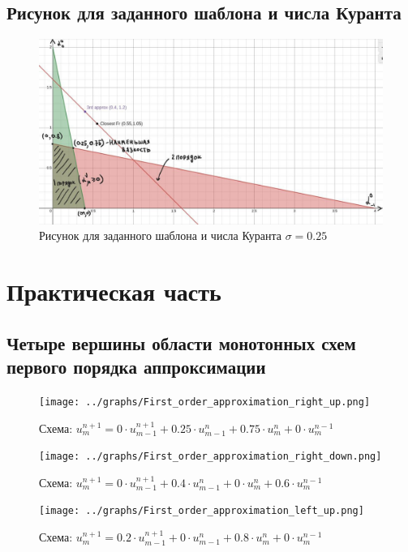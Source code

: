 \documentclass[a4paper, 12pt]{article} %
\begin{document}
\subsection{Рисунок для заданного шаблона и числа Куранта}
\begin{figure}[h!]
    \centering
    \includegraphics[width=17cm]{risunok.jpg}
    \caption{Рисунок для заданного шаблона и числа Куранта $\sigma = 0.25$}
    \label{fig:vac}
\end{figure} 


\section{Практическая часть}
\subsection{Четыре вершины области монотонных схем первого порядка аппроксимации}
\newpage
\begin{figure}[h!]
    \centering
    \texttt{[image: ../graphs/First\_order\_approximation\_right\_up.png]}
    \caption{Схема: $u^{n+1}_{m} = 0 \cdot u^{n+1}_{m-1} + 0.25 \cdot u^{n}_{m-1} + 0.75 \cdot u^{n}_{m} + 0 \cdot u^{n-1}_{m}$}
    \label{fig:vac}
\end{figure} 

\begin{figure}[h!]
    \centering
    \texttt{[image: ../graphs/First\_order\_approximation\_right\_down.png]}
    \caption{Схема: $u^{n+1}_{m} = 0 \cdot u^{n+1}_{m-1} + 0.4 \cdot u^{n}_{m-1} + 0 \cdot u^{n}_{m} + 0.6 \cdot u^{n-1}_{m}$}
    \label{fig:vac}
\end{figure} 

\begin{figure}[h!]
    \centering
    \texttt{[image: ../graphs/First\_order\_approximation\_left\_up.png]}
    \caption{Схема: $u^{n+1}_{m} = 0.2 \cdot u^{n+1}_{m-1} + 0 \cdot u^{n}_{m-1} + 0.8 \cdot u^{n}_{m} + 0 \cdot u^{n-1}_{m}$}
    \label{fig:vac}
\end{figure} 
\end{document}
